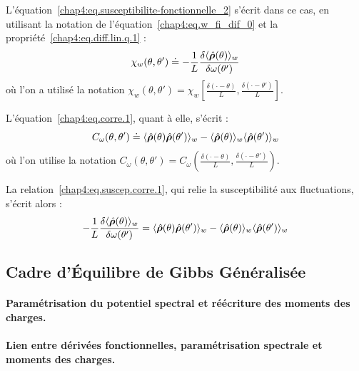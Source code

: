 L’équation~\eqref{chap4:eq.susceptibilite-fonctionnelle_2} s’écrit dans ce cas, en utilisant la notation de l’équation~\eqref{chap4:eq.w_fi_dif_0} et la propriété~\eqref{chap4:eq.diff.lin.q.1} :
\begin{equation}
	\chi_w(\theta, \theta') \doteq -\frac{1}{L} \frac{\delta \langle \hat{\bm{\rho}}(\theta) \rangle_w}{\delta \omega(\theta')} 
\end{equation}
où l’on a utilisé la notation $\chi_w(\theta, \theta') = \chi_w\left[\frac{\delta(\cdot - \theta)}{L}, \frac{\delta(\cdot - \theta')}{L} \right]$.

L’équation~\eqref{chap4:eq.corre.1}, quant à elle, s’écrit :
\begin{equation}
C_\omega(\theta, \theta') \doteq \langle \hat{\bm{\rho}}(\theta) \hat{\bm{\rho}}(\theta') \rangle_w - \langle \hat{\bm{\rho}}(\theta) \rangle_w \langle \hat{\bm{\rho}}(\theta') \rangle_w 
\end{equation}
où l’on utilise la notation $C_\omega(\theta, \theta') = C_\omega\left( \frac{\delta(\cdot - \theta)}{L}, \frac{\delta(\cdot - \theta')}{L} \right)$.

La relation~\eqref{chap4:eq.suscep.corre.1}, qui relie la susceptibilité aux fluctuations, s’écrit alors :
\begin{equation}
-\frac{1}{L} \frac{\delta \langle \hat{\bm{\rho}}(\theta) \rangle_w}{\delta \omega(\theta')} = \langle \hat{\bm{\rho}}(\theta) \hat{\bm{\rho}}(\theta') \rangle_w - \langle \hat{\bm{\rho}}(\theta) \rangle_w \langle \hat{\bm{\rho}}(\theta') \rangle_w 
\end{equation}


\subsection{Cadre d'Équilibre de Gibbs Généralisée}

\paragraph{Paramétrisation du potentiel spectral et réécriture des moments des charges.}
\paragraph{Lien entre dérivées fonctionnelles, paramétrisation spectrale et moments des charges.}

